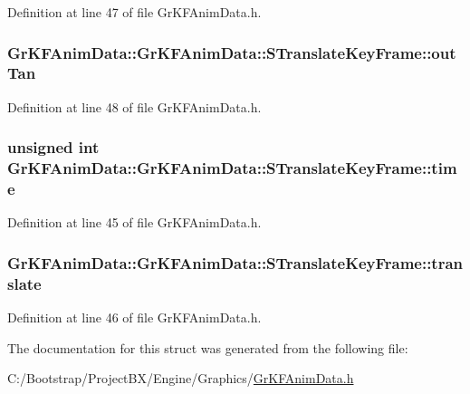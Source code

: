 Definition at line 47 of file GrKFAnimData.h.\hypertarget{struct_gr_k_f_anim_data_1_1_s_translate_key_frame_775346957ab8985be5ee291fb4871943}{
\subsubsection[{outTan}]{ GrKFAnimData::GrKFAnimData::STranslateKeyFrame::outTan}}
\label{struct_gr_k_f_anim_data_1_1_s_translate_key_frame_775346957ab8985be5ee291fb4871943}




Definition at line 48 of file GrKFAnimData.h.\hypertarget{struct_gr_k_f_anim_data_1_1_s_translate_key_frame_ea2e2e411a63b408e5ce12a5895022f9}{
\subsubsection[{time}]{\setlength{\rightskip}{0pt plus 5cm}unsigned int GrKFAnimData::GrKFAnimData::STranslateKeyFrame::time}}
\label{struct_gr_k_f_anim_data_1_1_s_translate_key_frame_ea2e2e411a63b408e5ce12a5895022f9}




Definition at line 45 of file GrKFAnimData.h.\hypertarget{struct_gr_k_f_anim_data_1_1_s_translate_key_frame_d887aed5252ff42d0a876bb9a1edc95a}{
\subsubsection[{translate}]{ GrKFAnimData::GrKFAnimData::STranslateKeyFrame::translate}}
\label{struct_gr_k_f_anim_data_1_1_s_translate_key_frame_d887aed5252ff42d0a876bb9a1edc95a}




Definition at line 46 of file GrKFAnimData.h.

The documentation for this struct was generated from the following file:\begin{CompactItemize}
\item 
C:/Bootstrap/ProjectBX/Engine/Graphics/\hyperlink{_gr_k_f_anim_data_8h}{GrKFAnimData.h}\end{CompactItemize}
